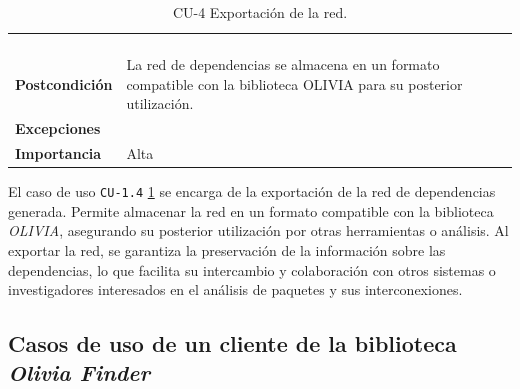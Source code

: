 \begin{table}[p]
\begin{tabularx}{\linewidth}{ p{} p{} }
\begin{enumerate}
		\end{enumerate}                                                                                          \\
		\textbf{Postcondición}        & La red de dependencias se almacena en un formato compatible con la biblioteca OLIVIA para su posterior utilización.                              \\
		\textbf{Excepciones}          &                                                                                                                                                  \\
		\textbf{Importancia}          & Alta                                                                                                                                             \\
		\bottomrule
	\end{tabularx}
	\caption{CU-4 Exportación de la red.}
	\label{tab:cu4}
\end{table}

El caso de uso \texttt{CU-1.4} \ref{tab:cu4} se encarga de la exportación de la red de dependencias generada. Permite
almacenar la red en un formato compatible con la biblioteca \textit{OLIVIA}, asegurando su posterior utilización por
otras herramientas o análisis. Al exportar la red, se garantiza la preservación de la información sobre las
dependencias, lo que facilita su intercambio y colaboración con otros sistemas o investigadores interesados
en el análisis de paquetes y sus interconexiones.

\newpage

\subsection{Casos de uso de un cliente de la biblioteca \textit{Olivia Finder}}


